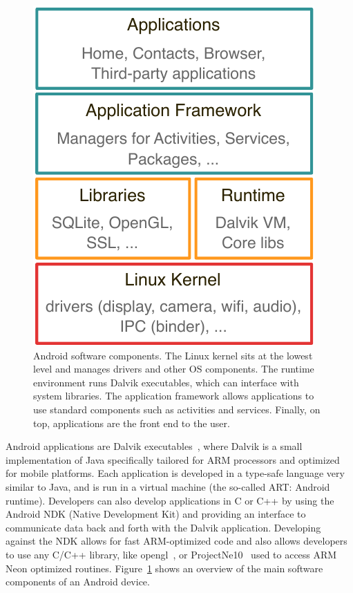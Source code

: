\begin{figure}[!t]
    \centering
    \includegraphics[width=.5\columnwidth]{figures/others/bg_android}
    \caption[Android software components]{Android software components. The Linux kernel sits at the lowest level and manages drivers and other OS components. The runtime environment runs Dalvik executables, which can interface with system libraries. The application framework allows applications to use standard components such as activities and services. Finally, on top, applications are the front end to the user.}
    \label{fig:bg_android_stack}
\end{figure}

Android applications are Dalvik executables~\cite{dalvik}, where Dalvik is a
small implementation of Java specifically tailored for ARM processors and
optimized for mobile platforms. Each application is developed in a type-safe
language very similar to Java, and is run in a virtual machine (the so-called
ART: Android runtime). Developers can also develop applications in C or C++ by
using the Android NDK (Native Development Kit) and providing an
interface to communicate data back and forth with the Dalvik application.
Developing against the NDK allows for fast ARM-optimized code and also allows
developers to use any C/C++ library, like opengl~\cite{androidopengl}, or
ProjectNe10~\cite{projectne10} used to access ARM Neon optimized routines.
Figure~\ref{fig:bg_android_stack} shows an overview of the main software
components of an Android device.

